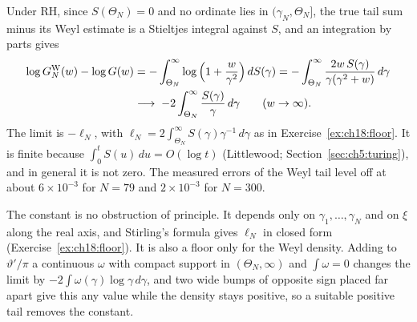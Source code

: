 Under RH, since $S(\Theta_N)=0$ and no ordinate lies in $(\gamma_N,\Theta_N]$, the true tail sum minus its Weyl estimate is a Stieltjes integral against $S$, and an integration by parts gives
\begin{align*}
\log G_N^{\rm W}(w)-\log G(w)&=-\int_{\Theta_N}^\infty\log\Big(1+\frac w{\gamma^2}\Big)\,dS(\gamma)=-\int_{\Theta_N}^\infty\frac{2w\,S(\gamma)}{\gamma(\gamma^2+w)}\,d\gamma\\
&\longrightarrow\;-2\int_{\Theta_N}^\infty\frac{S(\gamma)}\gamma\,d\gamma\qquad(w\to\infty).
\end{align*}
The limit is $-\ell_N$, with $\ell_N=2\int_{\Theta_N}^\infty S(\gamma)\gamma^{-1}\,d\gamma$ as in Exercise~\ref{ex:ch18:floor}. It is finite because $\int_0^tS(u)\,du=O(\log t)$ (Littlewood; Section~\ref{sec:ch5:turing}), and in general it is not zero. The measured errors of the Weyl tail level off at about $6\times10^{-3}$ for $N=79$ and $2\times10^{-3}$ for $N=300$.

The constant is no obstruction of principle. It depends only on
 $\gamma_1,\dots,\gamma_N$ and on $\xi$ along the real axis, and Stirling's formula gives $\ell_N$ in closed form (Exercise~\ref{ex:ch18:floor}). It is also a floor only for the Weyl density. Adding to $\vartheta'/\pi$ a continuous $\omega$ with compact support in $(\Theta_N,\infty)$ and $\int\omega=0$ changes the limit by $-2\int\omega(\gamma)\log\gamma\,d\gamma$, and two wide bumps of opposite sign placed far apart give this any value while the density stays positive, so a suitable positive tail removes the constant.


